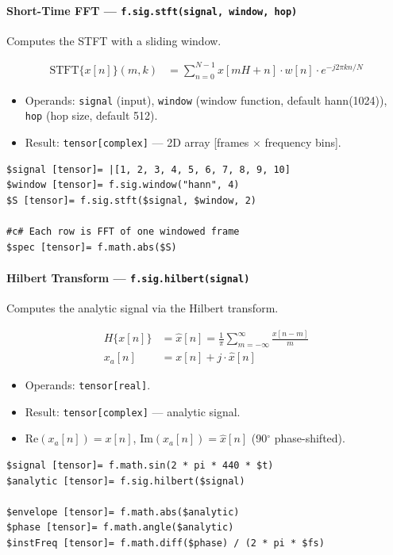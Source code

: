 \paragraph{Short-Time FFT --- \texttt{f.sig.stft(signal, window, hop)}}
Computes the STFT with a sliding window.

\begin{align}
\text{STFT}\{x[n]\}(m, k) &= \sum_{n=0}^{N-1} x[mH + n] \cdot w[n] \cdot e^{-j 2\pi k n / N} \label{eq:sig-stft}
\end{align}

\begin{itemize}
\item Operands: \texttt{signal} (input), \texttt{window} (window function, default hann(1024)), \texttt{hop} (hop size, default 512).
\item Result: \texttt{tensor[complex]} --- 2D array [frames $\times$ frequency bins].
\end{itemize}

\begin{verbatim}
$signal [tensor]= |[1, 2, 3, 4, 5, 6, 7, 8, 9, 10]
$window [tensor]= f.sig.window("hann", 4)
$S [tensor]= f.sig.stft($signal, $window, 2)

#c# Each row is FFT of one windowed frame
$spec [tensor]= f.math.abs($S)
\end{verbatim}

\paragraph{Hilbert Transform --- \texttt{f.sig.hilbert(signal)}}
Computes the analytic signal via the Hilbert transform.

\begin{align}
H\{x[n]\} &= \hat{x}[n] = \frac{1}{\pi} \sum_{m=-\infty}^{\infty} \frac{x[n-m]}{m} \label{eq:sig-hilbert} \\
x_a[n] &= x[n] + j \cdot \hat{x}[n] \label{eq:sig-analytic}
\end{align}

\begin{itemize}
\item Operands: \texttt{tensor[real]}.
\item Result: \texttt{tensor[complex]} --- analytic signal.
\item $\text{Re}(x_a[n]) = x[n]$, $\text{Im}(x_a[n]) = \hat{x}[n]$ (90$^\circ$ phase-shifted).
\end{itemize}

\begin{verbatim}
$signal [tensor]= f.math.sin(2 * pi * 440 * $t)
$analytic [tensor]= f.sig.hilbert($signal)

$envelope [tensor]= f.math.abs($analytic)
$phase [tensor]= f.math.angle($analytic)
$instFreq [tensor]= f.math.diff($phase) / (2 * pi * $fs)
\end{verbatim}

